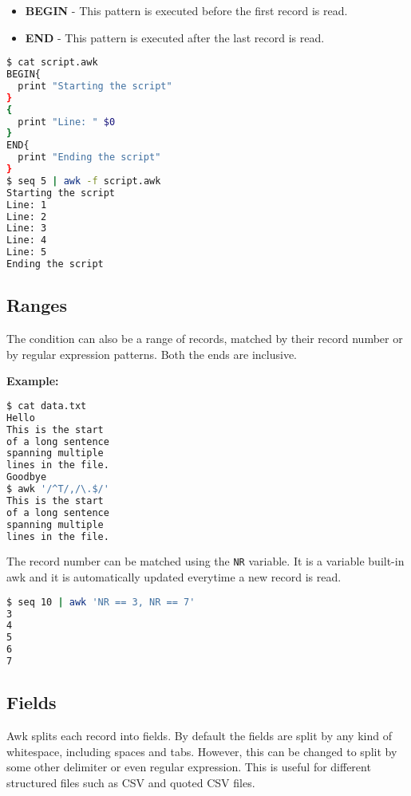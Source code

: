 \begin{itemize}
\item \textbf{BEGIN} - This pattern is executed before the first record is read.
\item \textbf{END} - This pattern is executed after the last record is read.
\end{itemize}

\begin{lstlisting}[language=bash]
$ cat script.awk
BEGIN{
  print "Starting the script"
}
{
  print "Line: " $0
}
END{
  print "Ending the script"
}
$ seq 5 | awk -f script.awk
Starting the script
Line: 1
Line: 2
Line: 3
Line: 4
Line: 5
Ending the script
\end{lstlisting}

\subsection{Ranges}

The condition can also be a range of records, matched by their record number or by regular expression patterns.
Both the ends are inclusive.

\textbf{Example:}

\begin{lstlisting}[language=bash]
$ cat data.txt
Hello
This is the start
of a long sentence
spanning multiple
lines in the file.
Goodbye
$ awk '/^T/,/\.$/'
This is the start
of a long sentence
spanning multiple
lines in the file.
\end{lstlisting}

The record number can be matched using the \lstinline|NR| variable. It is a variable built-in awk and it is automatically updated everytime a new record is read.

\begin{lstlisting}[language=bash]
$ seq 10 | awk 'NR == 3, NR == 7'
3
4
5
6
7
\end{lstlisting}

\subsection{Fields}

Awk splits each record into fields. By default the fields are split by any kind of whitespace, including spaces and tabs. However, this can be changed to split by some other delimiter or even regular expression. This is useful for different structured files such as CSV and quoted CSV files.

